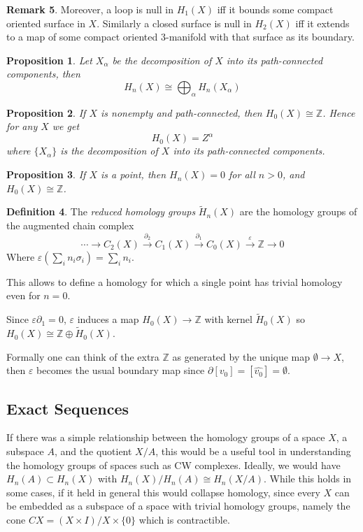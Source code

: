 \documentclass[11pt,a4paper]{article}
\theoremstyle{definition}
\newtheorem{definition}{Definition}[section]
\newtheorem{remark}[definition]{Remark}
\theoremstyle{plain}
\newtheorem{proposition}[definition]{Proposition}
\theoremstyle{remark}
\begin{document}
\begin{remark}
Moreover, a loop is null in $H_1(X)$ iff it bounds some compact oriented surface in $X$. Similarly
a closed surface is null in $H_2(X)$ iff it extends to a map of some compact oriented $3$-manifold with that surface as its boundary.

\begin{proposition}
  Let $X_\alpha$ be the decomposition of $X$ into its path-connected components, then 
  $$H_n(X) \cong \bigoplus_\alpha H_n(X_\alpha)$$
\end{proposition}

\begin{proposition}
  If $X$ is nonempty and path-connected, then $H_0(X) \cong \mathbb{Z}$. 
  Hence for any $X$ we get 
  $$H_0(X) = Z^\alpha$$
  where $\{X_\alpha\}$ is the decomposition of $X$ into its path-connected components.
\end{proposition}

\begin{proposition}
  If $X$ is a point, then $H_n(X) = 0$ for all $n > 0$, and $H_0(X) \cong \mathbb{Z}$. 
\end{proposition}

\begin{definition}
  The \emph{reduced homology groups} $\tilde{H}_n (X)$ are the homology groups of the augmented chain complex 
  $$\cdots \rightarrow C_2(X) \xrightarrow{\partial_2} C_1 (X) \xrightarrow{\partial_1} C_0 (X) \xrightarrow{\varepsilon} \mathbb{Z} \rightarrow 0$$
  Where $\varepsilon \left(\sum_i n_i \sigma_i\right) = \sum_i n_i$. 
\end{definition}
This allows to define a homology for which a single point has trivial homology even for $n = 0$. 

Since $\varepsilon \partial_1 = 0$, $\varepsilon$ induces a map $H_0(X) \to \mathbb{Z}$ with kernel 
$\tilde{H}_0(X)$ so $H_0(X) \cong \mathbb{Z} \oplus \tilde{H}_0(X)$. 

Formally one can think of the extra $\mathbb{Z}$ as generated by the unique map $\emptyset \to X$, then $\varepsilon$ becomes the usual boundary 
map since $\partial[v_0] = [\hat{v_0}] = \emptyset$. 

\subsection{Exact Sequences} 

If there was a simple relationship between the homology groups of a space $X$, a subspace $A$, 
and the quotient $X / A$, this would be a useful tool in understanding the homology groups 
of spaces such as CW complexes. 
Ideally, we would have $H_n(A) \subset H_n(X)$ with $H_n(X) / H_n(A) \cong H_n(X/A)$.
While this holds in some cases, if it held in general this would collapse homology, since 
every $X$ can be embedded as a subspace of a space with trivial homology groups, 
namely the cone $CX = (X \times I) / X \times \{0\}$ which is contractible. 


\end{remark}
\end{document}

